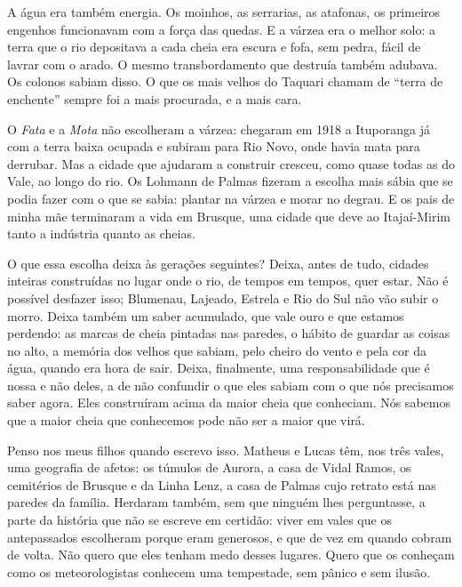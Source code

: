 \documentclass[
  brazilian,
  11pt,
  openany]{book}
\begin{document}
A água era também energia. Os moinhos, as serrarias, as atafonas, os
primeiros engenhos funcionavam com a força das quedas. E a várzea era o
melhor solo: a terra que o rio depositava a cada cheia era escura e
fofa, sem pedra, fácil de lavrar com o arado. O mesmo transbordamento
que destruía também adubava. Os colonos sabiam disso. O que os mais
velhos do Taquari chamam de ``terra de enchente'' sempre foi a mais
procurada, e a mais cara.

O \emph{Fata} e a \emph{Mota} não escolheram a várzea: chegaram em 1918
a Ituporanga já com a terra baixa ocupada e subiram para Rio Novo, onde
havia mata para derrubar. Mas a cidade que ajudaram a construir cresceu,
como quase todas as do Vale, ao longo do rio. Os Lohmann de Palmas
fizeram a escolha mais sábia que se podia fazer com o que se sabia:
plantar na várzea e morar no degrau. E os pais de minha mãe terminaram a
vida em Brusque, uma cidade que deve ao Itajaí-Mirim tanto a indústria
quanto as cheias.

O que essa escolha deixa às gerações seguintes? Deixa, antes de tudo,
cidades inteiras construídas no lugar onde o rio, de tempos em tempos,
quer estar. Não é possível desfazer isso; Blumenau, Lajeado, Estrela e
Rio do Sul não vão subir o morro. Deixa também um saber acumulado, que
vale ouro e que estamos perdendo: as marcas de cheia pintadas nas
paredes, o hábito de guardar as coisas no alto, a memória dos velhos que
sabiam, pelo cheiro do vento e pela cor da água, quando era hora de
sair. Deixa, finalmente, uma responsabilidade que é nossa e não deles, a
de não confundir o que eles sabiam com o que nós precisamos saber agora.
Eles construíram acima da maior cheia que conheciam. Nós sabemos que a
maior cheia que conhecemos pode não ser a maior que virá.

Penso nos meus filhos quando escrevo isso. Matheus e Lucas têm, nos três
vales, uma geografia de afetos: os túmulos de Aurora, a casa de Vidal
Ramos, os cemitérios de Brusque e da Linha Lenz, a casa de Palmas cujo
retrato está nas paredes da família. Herdaram também, sem que ninguém
lhes perguntasse, a parte da história que não se escreve em certidão:
viver em vales que os antepassados escolheram porque eram generosos, e
que de vez em quando cobram de volta. Não quero que eles tenham medo
desses lugares. Quero que os conheçam como os meteorologistas conhecem
uma tempestade, sem pânico e sem ilusão.
\end{document}
